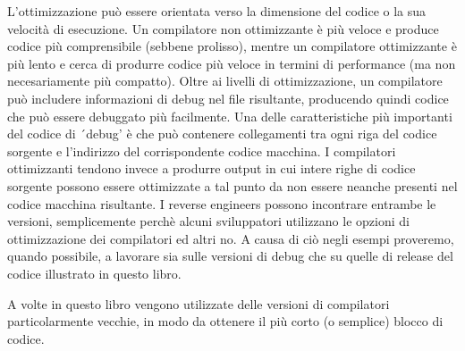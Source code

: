 L'ottimizzazione può essere orientata verso la dimensione del codice o la sua velocità di esecuzione.
Un compilatore non ottimizzante è più veloce e produce codice più comprensibile (sebbene prolisso), mentre un compilatore ottimizzante è più lento e cerca di produrre codice più veloce in termini di performance (ma non necesariamente più compatto).
Oltre ai livelli di ottimizzazione, un compilatore può includere informazioni di debug nel file risultante, producendo quindi codice che può essere debuggato più facilmente.
Una delle caratteristiche più importanti del codice di ´debug' è che può contenere collegamenti tra ogni riga del codice sorgente e l'indirizzo del corrispondente codice macchina.
I compilatori ottimizzanti tendono invece a produrre output in cui intere righe di codice sorgente possono essere ottimizzate a tal punto da non essere neanche presenti nel codice macchina risultante.
I reverse engineers possono incontrare entrambe le versioni, semplicemente perchè alcuni sviluppatori utilizzano le opzioni di ottimizzazione dei compilatori ed altri no.
A causa di ciò negli esempi proveremo, quando possibile, a lavorare sia sulle versioni di debug che su quelle di release del codice illustrato in questo libro.

A volte in questo libro vengono utilizzate delle versioni di compilatori particolarmente vecchie, in modo da ottenere il più corto (o semplice) blocco di codice.
